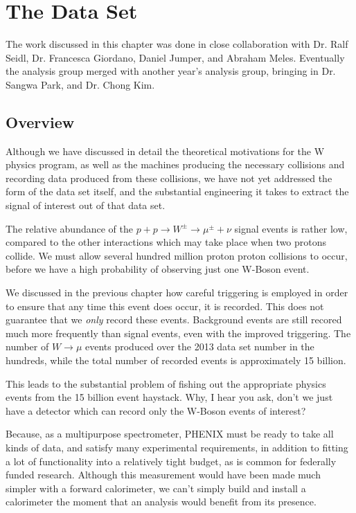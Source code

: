 \chapter{The Data Set}
The work discussed in this chapter was done in close collaboration with Dr. Ralf
Seidl, Dr. Francesca Giordano, Daniel Jumper, and Abraham Meles. Eventually the
analysis group merged with another year's analysis group, bringing in Dr. Sangwa
Park, and Dr. Chong Kim.

\label{ch:data_collection}
\section{Overview}
Although we have discussed in detail the theoretical motivations for the W
physics program, as well as the machines producing the necessary collisions and
recording data produced from these collisions, we have not yet addressed the
form of the data set itself, and the substantial engineering it takes to extract
the signal of interest out of that data set.

The relative abundance of the $p + p \rightarrow W^\pm \rightarrow \mu^\pm +
\nu$ signal events is rather low, compared to the other interactions which may
take place when two protons collide. We must allow several hundred million
proton proton collisions to occur, before we have a high probability of
observing just one W-Boson event. 

We discussed in the previous chapter how careful triggering is employed in order
to ensure that any time this event does occur, it is recorded. This does not
guarantee that we \textit{only} record these events. Background events are still
recored much more frequently than signal events, even with the improved
triggering. The number of $W\rightarrow\mu$ events produced over the 2013 data
set number in the hundreds, while the total number of recorded events is
approximately 15 billion.

This leads to the substantial problem of fishing out the appropriate physics
events from the 15 billion event haystack. Why, I hear you ask, don't we just
have a detector which can record only the W-Boson events of interest?

Because, as a multipurpose spectrometer, PHENIX must be ready to take
all kinds of data, and satisfy many experimental requirements, in addition to
fitting a lot of functionality into a relatively tight budget, as is common for
federally funded research. Although this measurement would have been made
much simpler with a forward calorimeter, we can't simply build and install a
calorimeter the moment that an analysis would benefit from its presence.

